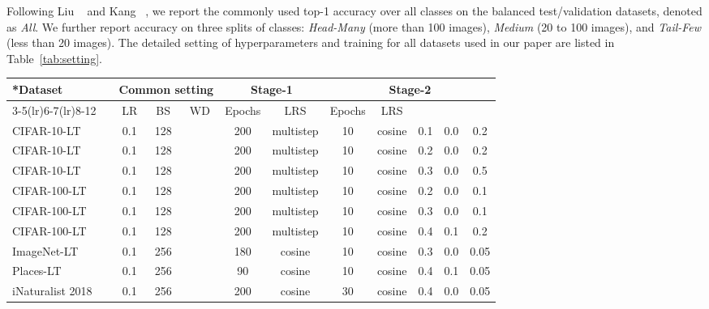 \documentclass[final]{cvpr}
\begin{document}
	
	Following Liu \etal~\cite{liu2019large} and Kang \etal~\cite{decouple}, we report the commonly used top-1 accuracy over all classes on the balanced test/validation datasets, denoted as \textit{All}. We further report accuracy on three splits of classes: \textit{Head-Many} (more than 100 images), \textit{Medium} (20 to 100 images), and \textit{Tail-Few} (less than 20 images). The detailed setting of hyperparameters and training for all datasets used in our paper are listed in Table~\ref{tab:setting}.
	
	\begin{table*}[h]
		\setlength{\tabcolsep}{6pt}
		\centering
		\vspace{-5pt}
		\begin{tabular}{ll|ccc|cc|ccccc}
			\toprule[1.5pt]
			{\multirow{2.5}*{\textbf{Dataset}}}	& &\multicolumn{3}{c|}{Common setting} & \multicolumn{2}{c|}{Stage-1}  & \multicolumn{5}{c}{Stage-2}\\ 
			\cmidrule(lr){3-5}\cmidrule(lr){6-7}\cmidrule(lr){8-12}
			& & LR & BS 	 & WD & {Epochs}	& LRS & {Epochs}	& LRS &  &  &	 \\ 
			\midrule
			CIFAR-10-LT&  & 0.1  & 128  &   & 200  & multistep  &  10 & cosine & 0.1 & 0.0 &   0.2 \\CIFAR-10-LT&   & 0.1  & 128  &   & 200  & multistep  &  10 & cosine & 0.2 & 0.0 &   0.2 \\CIFAR-10-LT&   & 0.1  & 128  &   & 200  & multistep  &  10 & cosine & 0.3 & 0.0 &   0.5 \\\midrule
			CIFAR-100-LT&   & 0.1  & 128  &   & 200  & multistep  &  10 & cosine & 0.2 & 0.0 &   0.1 \\CIFAR-100-LT&   & 0.1  & 128  &   & 200  & multistep  &  10 & cosine & 0.3 & 0.0 &   0.1 \\CIFAR-100-LT&   & 0.1  & 128  &   & 200  & multistep  &  10 & cosine & 0.4 & 0.1 &   0.2 \\\midrule
			ImageNet-LT & & 0.1  & 256  &   & 180  & cosine  &  10 & cosine & 0.3 & 0.0 &   0.05 \\Places-LT & & 0.1  & 256  &  & 90  & {cosine}  &  10 & {cosine} & 0.4 & 0.1 &   0.05 \\iNaturalist 2018 &  & 0.1  & 256  &   & 200  & {cosine}  &  30 & {cosine} & 0.4 & 0.0 &   0.05 \\\bottomrule[1.5pt]     
		\end{tabular}
		\vspace{-5pt}
		\caption{Detailed experiment setting on five benchmark datasets. LR: initial learning rate, BS: batch size, WD: weight decay, LRS: learning rate schedule, and : learning rate ratio of .}
		\vspace{-10pt}
		\label{tab:setting}
	\end{table*}
	
\end{document}
